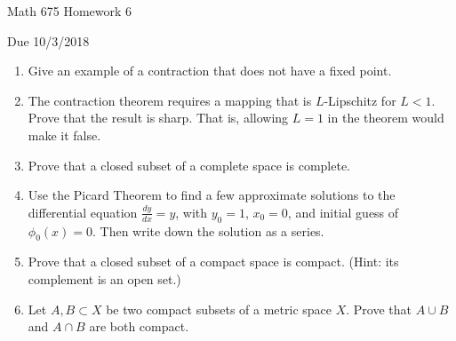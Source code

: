 \documentclass[12pt,letterpaper,reqno]{amsart}
\begin{document}
\thispagestyle{empty}
\centerline{\Large Math 675 Homework 6}
\centerline{Due 10/3/2018}
\vspace{.25in}

\begin{enumerate}[1.]
\item Give an example of a contraction that does not have a fixed point.
\item The contraction theorem requires a mapping that is $L$-Lipschitz for $L<1$. Prove that the result is sharp. That is, allowing $L=1$ in the theorem would make it false.
\item Prove that a closed subset of a complete space is complete.
\item Use the Picard Theorem to find a few approximate solutions to the differential equation $\frac{dy}{dx}=y$, with $y_0=1$, $x_0=0$, and initial guess of $\phi_0(x)=0$. Then write down the solution as a series.
\item Prove that a closed subset of a compact space is compact. (Hint: its complement is an open set.)
\item Let $A, B\subset X$ be two compact subsets of a metric space $X$. Prove that $A\cup B$ and $A\cap B$ are both compact.
\end{enumerate}
\end{document}
